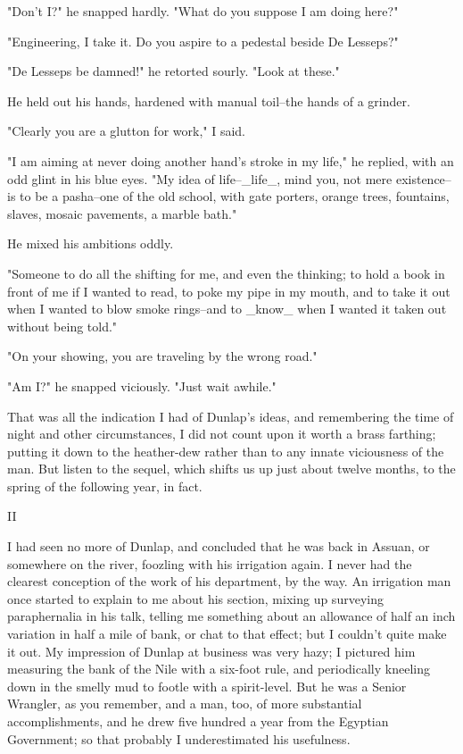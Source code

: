 "Don't I?" he snapped hardly. "What do you suppose I am doing here?"

"Engineering, I take it. Do you aspire to a pedestal beside De
Lesseps?"

"De Lesseps be damned!" he retorted sourly. "Look at these."

He held out his hands, hardened with manual toil--the hands of a
grinder.

"Clearly you are a glutton for work," I said.

"I am aiming at never doing another hand's stroke in my life," he
replied, with an odd glint in his blue eyes. "My idea of life--_life_,
mind you, not mere existence--is to be a pasha--one of the old school,
with gate porters, orange trees, fountains, slaves, mosaic pavements,
a marble bath."

He mixed his ambitions oddly.

"Someone to do all the shifting for me, and even the thinking; to hold
a book in front of me if I wanted to read, to poke my pipe in my mouth,
and to take it out when I wanted to blow smoke rings--and to _know_
when I wanted it taken out without being told."

"On your showing, you are traveling by the wrong road."

"Am I?" he snapped viciously. "Just wait awhile."

That was all the indication I had of Dunlap's ideas, and remembering
the time of night and other circumstances, I did not count upon it
worth a brass farthing; putting it down to the heather-dew rather than
to any innate viciousness of the man. But listen to the sequel, which
shifts us up just about twelve months, to the spring of the following
year, in fact.


II

I had seen no more of Dunlap, and concluded that he was back in
Assuan, or somewhere on the river, foozling with his irrigation again.
I never had the clearest conception of the work of his department, by
the way. An irrigation man once started to explain to me about his
section, mixing up surveying paraphernalia in his talk, telling me
something about an allowance of half an inch variation in half a mile
of bank, or chat to that effect; but I couldn't quite make it out. My
impression of Dunlap at business was very hazy; I pictured him
measuring the bank of the Nile with a six-foot rule, and periodically
kneeling down in the smelly mud to footle with a spirit-level. But he
was a Senior Wrangler, as you remember, and a man, too, of more
substantial accomplishments, and he drew five hundred a year from the
Egyptian Government; so that probably I underestimated his usefulness.

